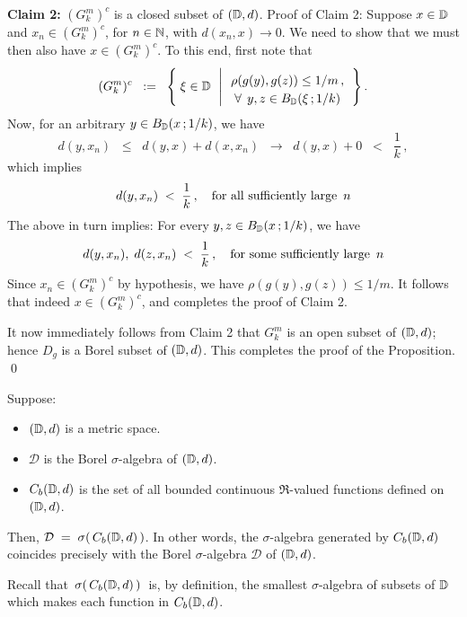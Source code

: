 \vskip 0.5cm
\noindent
\textbf{Claim 2:}\;\;
$(G^{m}_{k})^{c}$ is a closed subset of $(\mathbb{D},d)$.
\vskip 0.2cm
\noindent
Proof of Claim 2:\;\;
Suppose $x \in \mathbb{D}$ and $x_{n} \in (G^{m}_{k})^{c}$, for $n \in \mathbb{N}$, with $d(x_{n},x) \longrightarrow 0$.
We need to show that we must then also have $x \in (G^{m}_{k})^{c}$.
To this end, first note that
\begin{equation*}
(G^{m}_{k})^{c}
\;\; := \;\;
	\left\{\;
		\xi\overset{{\color{white}.}}{\in}\D
		\;\,\left\vert\,
		\begin{array}{c}
			\rho(g(y),g(z)) \overset{{\color{white}-}}{\leq} 1/m\,,
			\\
			\overset{{\color{white}.}}{\forall} \;\,y,z \in B_{\D}(\xi\,;1/k)
		\end{array}
		\right.
		\right\}.
\end{equation*}
Now, for an arbitrary $y \in B_{\mathbb{D}}(x\,;1/k)$, we have
\begin{equation*}
d(y,x_{n}) \;\;\leq\;\; d(y,x) + d(x,x_{n}) \;\;\longrightarrow\;\; d(y,x) + 0 \;\;<\;\; \dfrac{1}{k}\,,
\end{equation*}
which implies
\begin{equation*}
d(y,x_{n}) \;<\; \dfrac{1}{k}\,,
\quad
\textnormal{for all sufficiently large \,$n$}
\end{equation*}
The above in turn implies: For every $y,z \in B_{\mathbb{D}}(x\,;1/k)$, we have
\begin{equation*}
d(y,x_{n}),\;d(z,x_{n})  \;<\; \dfrac{1}{k}\,,
\quad
\textnormal{for some sufficiently large \,$n$}
\end{equation*}
Since $x_{n} \in (G^{m}_{k})^{c}$ by hypothesis, we have
$\rho(g(y),g(z)) \leq 1/m$.
It follows that indeed $x \in (G^{m}_{k})^{c}$, and completes the proof of Claim 2.

\vskip 0.5cm
\noindent
It now immediately follows from Claim 2 that $G^{m}_{k}$ is an open subset of $(\mathbb{D},d)$;
hence $D_{g}$ is a Borel subset of $(\mathbb{D},d)$.
This completes the proof of the Proposition.
\qed


\begin{lemma}
\label{DeqSigmaCb}
\mbox{}\vskip 0.1cm
\noindent
Suppose:
\begin{itemize}
\item
	$(\mathbb{D},d)$ is a metric space.
\item
	$\mathcal{D}$ is the Borel $\sigma$-algebra of $(\mathbb{D},d)$.
\item
	$C_{b}(\mathbb{D},d)$ is the set of all bounded continuous $\Re$-valued functions defined on $(\mathbb{D},d)$.
\end{itemize}
Then, $\mathcal{D} \;=\; \sigma\!\left(\,C_{b}(\mathbb{D},d)\,\right)$.
In other words, the $\sigma$-algebra generated by $C_{b}(\mathbb{D},d)$
coincides precisely with the Borel $\sigma$-algebra $\mathcal{D}$ of $(\mathbb{D},d)$.
\end{lemma}
\proof
\vskip 0.1cm
\noindent
Recall that \,$\sigma\!\left(\,C_{b}(\mathbb{D},d)\,\right)$\, is, by definition, the smallest
$\sigma$-algebra of subsets of $\mathbb{D}$ which makes each function in $C_{b}(\mathbb{D},d)$.


